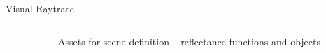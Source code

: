 \documentclass[final,hyperref={pdfpagelabels=false}]{beamer}
\begin{document}
\begin{frame}[t]
\begin{columns}[t]
\begin{column}{.96\textwidth}
\begin{block}{Visual Raytrace}
    
\end{block}

\end{column}

\begin{column}{.025\textwidth}\end{column} %

\end{columns} %



\begin{columns}[t] %

\begin{column}{.025\textwidth}\end{column} %

\begin{column}{.4675\textwidth} %


\begin{block}{Assets for scene definition -- reflectance functions and objects}
    \begin{figure}
    	\center
    	

\end{figure}
\end{block}
\end{column}
\end{columns}
\end{frame}
\end{document}
